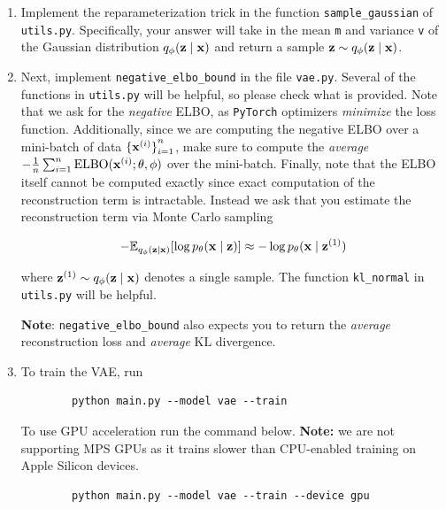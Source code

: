 \begin{enumerate}[label=(\alph*)]
    \item {} Implement the reparameterization trick in the function \texttt{sample\_gaussian} of \texttt{utils.py}. 
    Specifically, your answer will take in the mean \texttt{m} and variance \texttt{v} of the Gaussian distribution 
    $q_{\phi}(\mathbf{z} \mid \mathbf{x})$ and return a sample $\mathbf{z} \sim q_{\phi}(\mathbf{z} \mid \mathbf{x})$.

    \item {} Next, implement \texttt{negative\_elbo\_bound} in the file \texttt{vae.py}. Several of the functions in \texttt{utils.py} 
    will be helpful, so please check what is provided. Note that we ask for the \textit{negative} ELBO, as \texttt{PyTorch} optimizers 
    \textit{minimize} the loss function. Additionally, since we are computing the negative ELBO over a mini-batch of data 
    ${\{\mathbf{x}^{(i)}\}}_{i=1}^{n}$, make sure to compute the \textit{average} $- \frac{1}{n}\sum_{i=1}^{n} \text{ELBO}(\mathbf{x}^{(i)}; \theta, \phi)$ 
    over the mini-batch. Finally, note that the ELBO itself cannot be computed exactly since exact computation of the reconstruction 
    term is intractable. Instead we ask that you estimate the reconstruction term via Monte Carlo sampling

    \begin{equation} \label{eq:5}
        - \mathbb{E}_{q_{\phi}(\mathbf{z} \mid \mathbf{x})} [\log p_{\theta}(\mathbf{x} \mid \mathbf{z})] \approx - \log p_{\theta}(\mathbf{x} \mid \mathbf{z}^{(1)})
    \end{equation}

    where $\mathbf{z}^{(1)} \sim q_{\phi}(\mathbf{z} \mid \mathbf{x})$ denotes a single sample. The function \texttt{kl\_normal} in \texttt{utils.py} 
    will be helpful.
    
    \textbf{Note}: \texttt{negative\_elbo\_bound} also expects you to return the \textit{average} reconstruction loss 
    and \textit{average} KL divergence.

    \item {} To train the VAE, run
    
    \begin{verbatim}
        python main.py --model vae --train
    \end{verbatim}

    To use GPU acceleration run the command below. \textbf{Note:} we are not supporting MPS GPUs as it trains slower than CPU-enabled training on Apple Silicon devices.
    \begin{verbatim}
        python main.py --model vae --train --device gpu
    \end{verbatim}
    

\end{enumerate}
